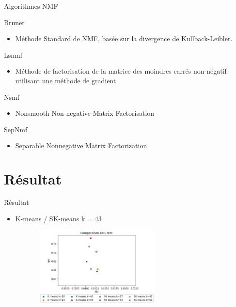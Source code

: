 \documentclass{beamer}
\begin{document}
\begin{frame}{Algorithmes NMF}
\begin{block}{Brunet}
\begin{itemize}
  \item {Méthode Standard de NMF, basée sur la divergence de Kullback-Leibler.}
\end{itemize}
\end{block}

\begin{block}{Lsnmf}
\begin{itemize}
\item Méthode de factorisation de la matrice des moindres carrés non-négatif utilisant une méthode de gradient 
\end{itemize}
\end{block}

\begin{block}{Nsmf}
\begin{itemize}
\item Nonsmooth Non negative Matrix Factorisation
\end{itemize}
\end{block}

\begin{block}{SepNmf}
\begin{itemize}
\item Separable Nonnegative Matrix Factorization
\end{itemize}
\end{block}

\end{frame}


\section{Résultat}


\begin{frame}{Résultat}

\begin{itemize}
  \item K-means / SK-means k = 43   
\end{itemize}
\begin{figure}
\includegraphics[width=8cm ,height= 4cm]{clustering-comparaison.png}
\end{figure}

\end{frame}
\end{document}

